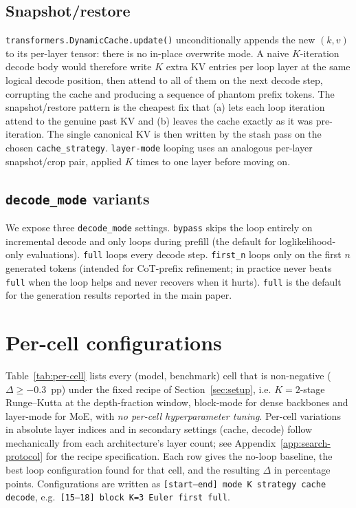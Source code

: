 \subsection{Snapshot/restore}

\texttt{transformers.DynamicCache.update()} unconditionally appends the new $(k,v)$ to its per-layer tensor: there is no in-place overwrite mode. A naive $K$-iteration decode body would therefore write $K$ extra KV entries per loop layer at the same logical decode position, then attend to all of them on the next decode step, corrupting the cache and producing a sequence of phantom prefix tokens. The snapshot/restore pattern is the cheapest fix that (a) lets each loop iteration attend to the genuine past KV and (b) leaves the cache exactly as it was pre-iteration. The single canonical KV is then written by the stash pass on the chosen \texttt{cache\_strategy}. \texttt{layer-mode} looping uses an analogous per-layer snapshot/crop pair, applied $K$ times to one layer before moving on.

\subsection{\texttt{decode\_mode} variants}

We expose three \texttt{decode\_mode} settings. \texttt{bypass} skips the loop entirely on incremental decode and only loops during prefill (the default for loglikelihood-only evaluations). \texttt{full} loops every decode step. \texttt{first\_n} loops only on the first $n$ generated tokens (intended for CoT-prefix refinement; in practice never beats \texttt{full} when the loop helps and never recovers when it hurts). \texttt{full} is the default for the generation results reported in the main paper.

\section{Per-cell configurations}
\label{app:per-cell}

Table~\ref{tab:per-cell} lists every (model, benchmark) cell that is non-negative ($\Delta \geq -0.3$~pp) under the fixed recipe of Section~\ref{sec:setup}, i.e. $K{=}2$-stage Runge--Kutta at the depth-fraction window, block-mode for dense backbones and layer-mode for MoE, with \emph{no per-cell hyperparameter tuning}. Per-cell variations in absolute layer indices and in secondary settings (cache, decode) follow mechanically from each architecture's layer count; see Appendix~\ref{app:search-protocol} for the recipe specification. Each row gives the no-loop baseline, the best loop configuration found for that cell, and the resulting $\Delta$ in percentage points. Configurations are written as \texttt{[start--end] mode K strategy cache decode}, e.g.\ \texttt{[15--18] block K=3 Euler first full}.

